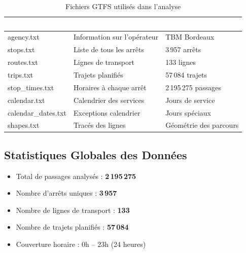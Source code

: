 \documentclass[12pt,a4paper]{article}
\begin{document}
\begin{table}[H]
\centering
\begin{tabular}{|l|l|l|}
\hline
\rowcolor{bleuTBM} \textcolor{white}{\textbf{Fichier}} & \textcolor{white}{\textbf{Description}} & \textcolor{white}{\textbf{Contenu}} \\
\hline
agency.txt & Information sur l'opérateur & TBM Bordeaux \\
\hline
\rowcolor{grisClair} stops.txt & Liste de tous les arrêts & 3\,957 arrêts \\
\hline
routes.txt & Lignes de transport & 133 lignes \\
\hline
\rowcolor{grisClair} trips.txt & Trajets planifiés & 57\,084 trajets \\
\hline
stop\_times.txt & Horaires à chaque arrêt & 2\,195\,275 passages \\
\hline
\rowcolor{grisClair} calendar.txt & Calendrier des services & Jours de service \\
\hline
calendar\_dates.txt & Exceptions calendrier & Jours spéciaux \\
\hline
\rowcolor{grisClair} shapes.txt & Tracés des lignes & Géométrie des parcours \\
\hline
\end{tabular}
\caption{Fichiers GTFS utilisés dans l'analyse}
\end{table}

\subsection{Statistiques Globales des Données}

\begin{infobox}
\begin{itemize}[leftmargin=0.5cm]
    \item Total de passages analysés : \textbf{2\,195\,275}
    \item Nombre d'arrêts uniques : \textbf{3\,957}
    \item Nombre de lignes de transport : \textbf{133}
    \item Nombre de trajets planifiés : \textbf{57\,084}
    \item Couverture horaire : 0h -- 23h (24 heures)
\end{itemize}
\end{infobox}

\newpage
\end{document}
